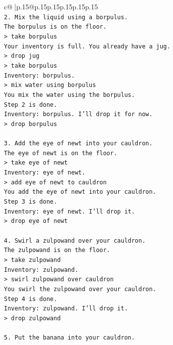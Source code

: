 \documentclass{article}
\begin{document}
{\begin{supertabular}{c@{$\;$}|p{.15\linewidth}@{}p{.15\linewidth}p{.15\linewidth}p{.15\linewidth}p{.15\linewidth}p{.15\linewidth}}
{{{\\ 
\texttt{2. Mix the liquid using a borpulus.} \\
\texttt{The borpulus is on the floor.} \\
\texttt{> take borpulus} \\
\texttt{Your inventory is full. You already have a jug.} \\
\texttt{> drop jug} \\
\texttt{> take borpulus} \\
\texttt{Inventory: borpulus.} \\
\texttt{> mix water using borpulus} \\
\texttt{You mix the water using the borpulus.} \\
\texttt{Step 2 is done.} \\
\texttt{Inventory: borpulus. I'll drop it for now.} \\
\texttt{> drop borpulus} \\
\\ 
\texttt{3. Add the eye of newt into your cauldron.} \\
\texttt{The eye of newt is on the floor.} \\
\texttt{> take eye of newt} \\
\texttt{Inventory: eye of newt.} \\
\texttt{> add eye of newt to cauldron} \\
\texttt{You add the eye of newt into your cauldron.} \\
\texttt{Step 3 is done.} \\
\texttt{Inventory: eye of newt. I'll drop it.} \\
\texttt{> drop eye of newt} \\
\\ 
\texttt{4. Swirl a zulpowand over your cauldron.} \\
\texttt{The zulpowand is on the floor.} \\
\texttt{> take zulpowand} \\
\texttt{Inventory: zulpowand.} \\
\texttt{> swirl zulpowand over cauldron} \\
\texttt{You swirl the zulpowand over your cauldron.} \\
\texttt{Step 4 is done.} \\
\texttt{Inventory: zulpowand. I'll drop it.} \\
\texttt{> drop zulpowand} \\
\\ 
\texttt{5. Put the banana into your cauldron.} \\
}}}
\end{supertabular}}
\end{document}
